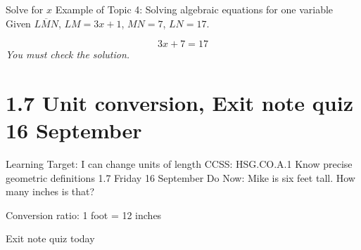 \begin{frame}{Solve for $x$}
  {Example of Topic 4: Solving algebraic equations for one variable}
  Given $\overline{LMN}$, $LM=3x+1$, $MN=7$, $LN=17$.
    \begin{flushleft}
    \end{flushleft} \vspace{1cm}
  \large \[ 3x+7=17 \]  \vspace{1cm}
  \emph{You must check the solution.}
\end{frame}

\section{1.7 Unit conversion, Exit note quiz \hfill 16 September}
\begin{frame}{Learning Target: I can change units of length}
  {CCSS: HSG.CO.A.1 Know precise geometric definitions  \hfill \alert{1.7 Friday 16 September}}
  Do Now: Mike is six feet tall. How many inches is that? \par \vspace{0.25cm}
  Conversion ratio: 1 foot = 12 inches \par
  \vspace{3cm}
  \alert{Exit note quiz today}
\end{frame}

